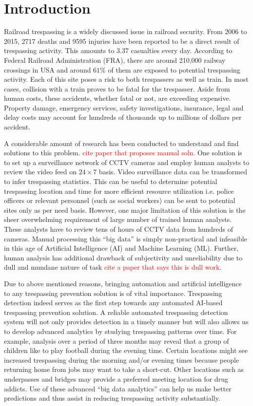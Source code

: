 \section{Introduction}
Railroad trespassing is a widely discussed issue in railroad security\cite{}. From 2006 to 2015, 2717 deaths and 9595 injuries have been reported to be a direct result of trespassing activity\cite{}. This amounts to 3.37 casualties every day. According to Federal Railroad Administration (FRA), there are around 210,000 railway crossings in USA and around $61\%$ of them are exposed to potential trespassing activity. Each of this site poses a risk to both trespassers as well as train. In most cases, collision with a train proves to be fatal for the trespasser. Aside from human costs, these accidents, whether fatal or not, are exceeding expensive. Property damage, emergency services, safety investigations, insurance, legal and delay costs may account for hundreds of thousands up to millions of dollars per accident\cite{}. 

A considerable amount of research has been conducted to understand and find solutions to this problem\cite{}. \textcolor{red}{cite paper that proposes manual soln.} One solution is to set up a surveillance network of CCTV cameras and employ human analysts to review the video feed on $24 \times 7$
basis. Video surveillance data can be transformed to infer trespassing statistics. This can be useful to determine potential trespassing location and time for more efficient resource utilization i.e. police officers or relevant personnel (such as social workers) can be sent to potential sites only as per need basis. However, one major limitation of this solution is the sheer overwhelming requirement of large number of trained human analysts. These analysts have to review tens of hours of CCTV data from hundreds of cameras. Manual processing this ``big data'' is simply non-practical and infeasible in this age of Artificial Intelligence (AI) and Machine Learning (ML). Further, human analysis has additional drawback of subjectivity and unreliability due to dull and mundane nature of task \textcolor{red}{cite a paper that says this is dull work}. 

Due to above mentioned reasons, bringing automation and artificial intelligence to any trespassing prevention solution is of vital importance. Trespassing detection indeed serves as the first step towards any automated AI-based trespassing prevention solution. A reliable automated trespassing detection system will not only provides detection in a timely manner but will also allows us to develop advanced analytics by studying trespassing patterns over time. For example, analysis over a period of three months may reveal that a group of children like to play football during the evening time. Certain locations might see increased trespassing during the morning and/or evening times because people returning home from jobs may want to take a short-cut. Other locations such as underpasses and bridges may provide a preferred meeting location for drug addicts. Use of these advanced ``big data analytics'' can help us make better predictions and thus assist in  reducing trespassing activity substantially.
